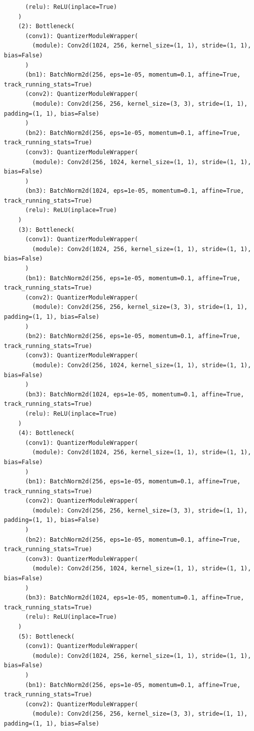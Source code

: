 \documentclass{article}
\begin{document}
\begin{verbatim}
      (relu): ReLU(inplace=True)
    )
    (2): Bottleneck(
      (conv1): QuantizerModuleWrapper(
        (module): Conv2d(1024, 256, kernel_size=(1, 1), stride=(1, 1), bias=False)
      )
      (bn1): BatchNorm2d(256, eps=1e-05, momentum=0.1, affine=True, track_running_stats=True)
      (conv2): QuantizerModuleWrapper(
        (module): Conv2d(256, 256, kernel_size=(3, 3), stride=(1, 1), padding=(1, 1), bias=False)
      )
      (bn2): BatchNorm2d(256, eps=1e-05, momentum=0.1, affine=True, track_running_stats=True)
      (conv3): QuantizerModuleWrapper(
        (module): Conv2d(256, 1024, kernel_size=(1, 1), stride=(1, 1), bias=False)
      )
      (bn3): BatchNorm2d(1024, eps=1e-05, momentum=0.1, affine=True, track_running_stats=True)
      (relu): ReLU(inplace=True)
    )
    (3): Bottleneck(
      (conv1): QuantizerModuleWrapper(
        (module): Conv2d(1024, 256, kernel_size=(1, 1), stride=(1, 1), bias=False)
      )
      (bn1): BatchNorm2d(256, eps=1e-05, momentum=0.1, affine=True, track_running_stats=True)
      (conv2): QuantizerModuleWrapper(
        (module): Conv2d(256, 256, kernel_size=(3, 3), stride=(1, 1), padding=(1, 1), bias=False)
      )
      (bn2): BatchNorm2d(256, eps=1e-05, momentum=0.1, affine=True, track_running_stats=True)
      (conv3): QuantizerModuleWrapper(
        (module): Conv2d(256, 1024, kernel_size=(1, 1), stride=(1, 1), bias=False)
      )
      (bn3): BatchNorm2d(1024, eps=1e-05, momentum=0.1, affine=True, track_running_stats=True)
      (relu): ReLU(inplace=True)
    )
    (4): Bottleneck(
      (conv1): QuantizerModuleWrapper(
        (module): Conv2d(1024, 256, kernel_size=(1, 1), stride=(1, 1), bias=False)
      )
      (bn1): BatchNorm2d(256, eps=1e-05, momentum=0.1, affine=True, track_running_stats=True)
      (conv2): QuantizerModuleWrapper(
        (module): Conv2d(256, 256, kernel_size=(3, 3), stride=(1, 1), padding=(1, 1), bias=False)
      )
      (bn2): BatchNorm2d(256, eps=1e-05, momentum=0.1, affine=True, track_running_stats=True)
      (conv3): QuantizerModuleWrapper(
        (module): Conv2d(256, 1024, kernel_size=(1, 1), stride=(1, 1), bias=False)
      )
      (bn3): BatchNorm2d(1024, eps=1e-05, momentum=0.1, affine=True, track_running_stats=True)
      (relu): ReLU(inplace=True)
    )
    (5): Bottleneck(
      (conv1): QuantizerModuleWrapper(
        (module): Conv2d(1024, 256, kernel_size=(1, 1), stride=(1, 1), bias=False)
      )
      (bn1): BatchNorm2d(256, eps=1e-05, momentum=0.1, affine=True, track_running_stats=True)
      (conv2): QuantizerModuleWrapper(
        (module): Conv2d(256, 256, kernel_size=(3, 3), stride=(1, 1), padding=(1, 1), bias=False)

\end{verbatim}
\end{document}
